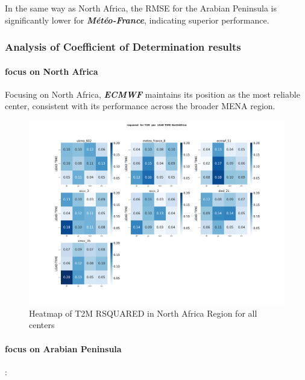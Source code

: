 In the same way as North Africa, the RMSE for the Arabian Peninsula is significantly lower for \textbf{\textit{Météo-France}}, indicating superior performance.
\subsubsection{Analysis of Coefficient of Determination results}
\paragraph{focus on North Africa}

Focusing on North Africa, \textbf{\textit{ECMWF}} maintains its position as the most reliable center, consistent with its performance across the broader MENA region.
\begin{figure}[H]
\includegraphics[scale=0.3]{plots/det/rsquared/rsquared_T2M_NorthAfrica.png}
\caption{Heatmap of T2M  RSQUARED in North Africa Region for all centers }
\end{figure}


\vspace{1.5cm}
\paragraph{focus on Arabian Peninsula}:


